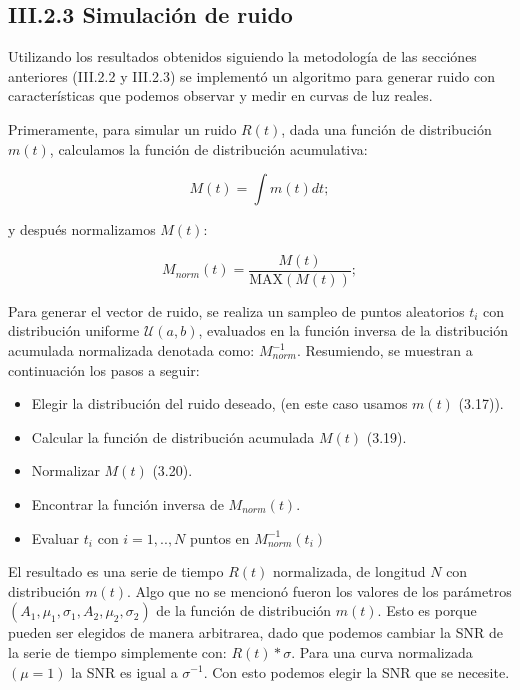 \subsection*{III.2.3 Simulación de ruido}

Utilizando los resultados obtenidos siguiendo la metodología de las secciónes anteriores (III.2.2 y III.2.3) se implementó un algoritmo para generar ruido con características que podemos observar y medir en curvas de luz reales.

Primeramente, para simular un ruido $R(t)$, dada una función de distribución $m(t)$, calculamos la función de distribución acumulativa:

\begin{equation}
  \displaystyle M(t)= \int m(t)dt;
\end{equation}

\noindent y después normalizamos $M(t)$:

\begin{equation}
  \displaystyle M_{norm}(t)= \dfrac{M(t)}{\mbox{MAX}(M(t))};
\end{equation}

Para generar el vector de ruido, se realiza un sampleo de puntos aleatorios $t_{i}$ con distribución uniforme $\mathcal{U}(a,b)$, evaluados en la función inversa de la distribución acumulada normalizada denotada como: $M^{-1}_{norm}$. Resumiendo, se muestran a continuación los pasos a seguir:

\begin{itemize}
  \item Elegir la distribución del ruido deseado, (en este caso usamos $m(t)$ (3.17)).
  \item Calcular la función de distribución acumulada $M(t)$ (3.19).
  \item Normalizar $M(t)$ (3.20).
  \item Encontrar la función inversa de $M_{norm}(t)$.
  \item Evaluar $t_{i}$ con $i=1,..,N$ puntos en $M^{-1}_{norm}(t_{i})$
\end{itemize}

El resultado es una serie de tiempo $R(t)$ normalizada, de longitud $N$ con distribución $m(t)$. Algo que no se mencionó fueron los valores de los parámetros $(A_{1},\mu_{1},\sigma_{1},A_{2},\mu_{2},\sigma_{2})$ de la función de distribución $m(t)$. Esto es porque pueden ser elegidos de manera arbitrarea, dado que podemos cambiar la SNR de la serie de tiempo simplemente con: $R(t)*\sigma$. Para una curva normalizada $(\mu=1)$ la SNR es igual a $\sigma^{-1}$. Con esto podemos elegir la SNR que se necesite.

